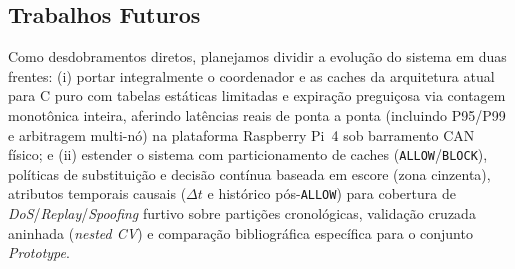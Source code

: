 \documentclass[conference]{IEEEtran}
\begin{document}
\subsection*{Trabalhos Futuros}
Como desdobramentos diretos, planejamos dividir a evolução do sistema em duas frentes: (i) portar integralmente o coordenador e as caches da arquitetura atual para C puro com tabelas estáticas limitadas e expiração preguiçosa via contagem monotônica inteira, aferindo latências reais de ponta a ponta (incluindo P95/P99 e arbitragem multi-nó) na plataforma Raspberry Pi~4 sob barramento CAN físico; e (ii) estender o sistema com particionamento de caches (\texttt{ALLOW}/\texttt{BLOCK}), políticas de substituição e decisão contínua baseada em escore (zona cinzenta), atributos temporais causais ($\Delta t$ e histórico pós-\texttt{ALLOW}) para cobertura de \textit{DoS}/\textit{Replay}/\textit{Spoofing} furtivo sobre partições cronológicas, validação cruzada aninhada (\textit{nested CV}) e comparação bibliográfica específica para o conjunto \textit{Prototype}.
\end{document}
